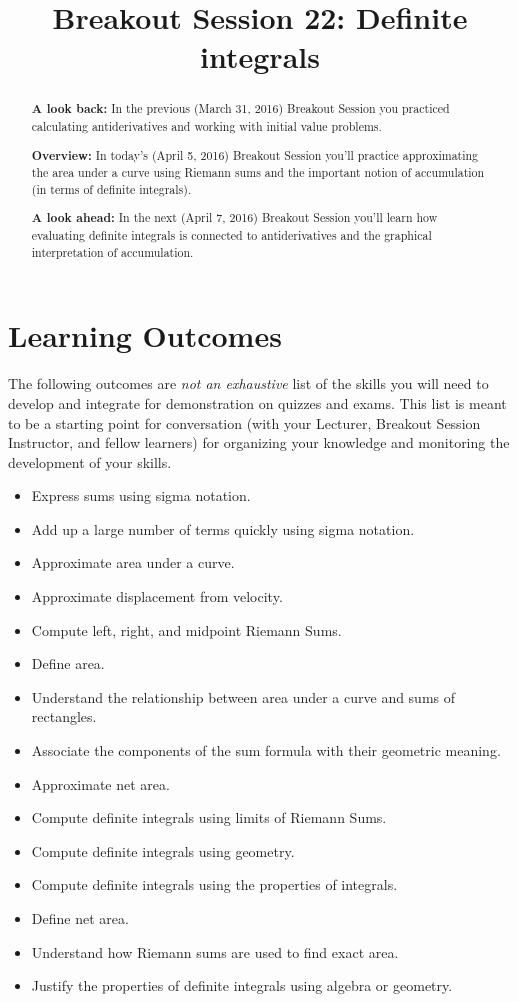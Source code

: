 \documentclass[handout, nooutcomes]{ximera}
\title{Breakout Session 22: Definite integrals}
\begin{document}
\begin{abstract}
  \textbf{A look back:} In the previous (March 31, 2016) Breakout Session you practiced calculating antiderivatives and working with initial value problems.

  \textbf{Overview:} In today's (April 5, 2016) Breakout Session you'll practice approximating the area under a curve using Riemann sums and the important notion of accumulation (in terms of definite integrals).
  
  \textbf{A look ahead:} In the next (April 7, 2016) Breakout Session you'll learn how evaluating definite integrals is connected to antiderivatives and the graphical interpretation of accumulation.
\end{abstract}
\maketitle

\section{Learning Outcomes}
\label{section:learning-outcomes}
The following outcomes are \emph{not an exhaustive} list of the skills you will need to develop and integrate for demonstration on quizzes and exams.
This list is meant to be a starting point for conversation (with your Lecturer, Breakout Session Instructor, and fellow learners) for organizing your knowledge and monitoring the development of your skills.

\begin{itemize}
  \item Express sums using sigma notation.
  \item Add up a large number of terms quickly using sigma notation.
  \item Approximate area under a curve.
  \item Approximate displacement from velocity.
  \item Compute left, right, and midpoint Riemann Sums.
  \item Define area.
  \item Understand the relationship between area under a curve and sums of rectangles.
  \item Associate the components of the sum formula with their geometric meaning.
  \item Approximate net area.
  \item Compute definite integrals using limits of Riemann Sums.
  \item Compute definite integrals using geometry.
  \item Compute definite integrals using the properties of integrals.
  \item Define net area.
  \item Understand how Riemann sums are used to find exact area.
  \item Justify the properties of definite integrals using algebra or geometry.
\end{itemize}
\newpage
\end{document}
